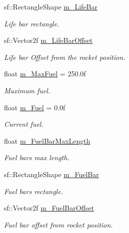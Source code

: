 \begin{DoxyCompactItemize}
\mbox{\label{class_rocket_a8ae0960136c6fb41a9795ca555c1f61d}} 
sf\+::\+Rectangle\+Shape \hyperlink{class_rocket_a8ae0960136c6fb41a9795ca555c1f61d}{m\+\_\+\+Life\+Bar}
\begin{DoxyCompactList}\small\item\em Life bar rectangle. \end{DoxyCompactList}\item 
\mbox{\label{class_rocket_a931d317896687553b03709b1532ef00f}} 
sf\+::\+Vector2f \hyperlink{class_rocket_a931d317896687553b03709b1532ef00f}{m\+\_\+\+Life\+Bar\+Offset}
\begin{DoxyCompactList}\small\item\em Life bar Offset from the rocket position. \end{DoxyCompactList}\item 
\mbox{\label{class_rocket_ac27158eb4ce58650f76a258bef38bb8e}} 
float \hyperlink{class_rocket_ac27158eb4ce58650f76a258bef38bb8e}{m\+\_\+\+Max\+Fuel} = 250.\+0f
\begin{DoxyCompactList}\small\item\em Maximum fuel. \end{DoxyCompactList}\item 
\mbox{\label{class_rocket_ab8321d9115c93fca3556d06d96edd627}} 
float \hyperlink{class_rocket_ab8321d9115c93fca3556d06d96edd627}{m\+\_\+\+Fuel} = 0.\+0f
\begin{DoxyCompactList}\small\item\em Current fuel. \end{DoxyCompactList}\item 
\mbox{\label{class_rocket_ab2987e91884c522731200e5b4b3b53c2}} 
float \hyperlink{class_rocket_ab2987e91884c522731200e5b4b3b53c2}{m\+\_\+\+Fuel\+Bar\+Max\+Length}
\begin{DoxyCompactList}\small\item\em Fuel bar\textquotesingle{}s max length. \end{DoxyCompactList}\item 
\mbox{\label{class_rocket_a8db4d19c2b34f322d5d772bd39227c9c}} 
sf\+::\+Rectangle\+Shape \hyperlink{class_rocket_a8db4d19c2b34f322d5d772bd39227c9c}{m\+\_\+\+Fuel\+Bar}
\begin{DoxyCompactList}\small\item\em Fuel bar\textquotesingle{}s rectangle. \end{DoxyCompactList}\item 
\mbox{\label{class_rocket_ab490e90b430de879b899d572d9e84a4d}} 
sf\+::\+Vector2f \hyperlink{class_rocket_ab490e90b430de879b899d572d9e84a4d}{m\+\_\+\+Fuel\+Bar\+Offset}
\begin{DoxyCompactList}\small\item\em Fuel bar offset from rocket position. \end{DoxyCompactList}\end{DoxyCompactItemize}
